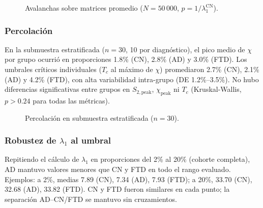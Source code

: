 \documentclass[12pt,a4paper]{article}
\begin{document}
\begin{figure}[H]
  \centering
  \caption{Avalanchas sobre matrices promedio ($N = 50\,000$, $p = 1/\lambda_1^{\text{CN}}$).}
  \label{fig:avalanchas}
\end{figure}

\subsubsection{Percolación}

En la submuestra estratificada ($n = 30$, 10 por diagnóstico), el pico medio de $\chi$ por
grupo ocurrió en proporciones 1.8\% (CN), 2.8\% (AD) y 3.0\% (FTD). Los umbrales críticos
individuales ($T_c$ al máximo de $\chi$) promediaron 2.7\% (CN), 2.1\% (AD) y 4.2\% (FTD),
con alta variabilidad intra-grupo (DE 1.2\%--3.5\%). No hubo diferencias significativas entre
grupos en $S_{2,\text{peak}}$, $\chi_{\text{peak}}$ ni $T_c$ (Kruskal-Wallis, $p > 0.24$ para
todas las métricas).

\begin{figure}[H]
  \centering
  \caption{Percolación en submuestra estratificada ($n = 30$).}
  \label{fig:percolacion}
\end{figure}

\subsubsection{Robustez de $\lambda_1$ al umbral}

Repitiendo el cálculo de $\lambda_1$ en proporciones del 2\% al 20\% (cohorte completa), AD
mantuvo valores menores que CN y FTD en todo el rango evaluado. Ejemplos: a 2\%, medias
7.89 (CN), 7.34 (AD), 7.93 (FTD); a 20\%, 33.70 (CN), 32.68 (AD), 33.82 (FTD). CN y FTD
fueron similares en cada punto; la separación AD--CN/FTD se mantuvo sin cruzamientos.
\end{document}

